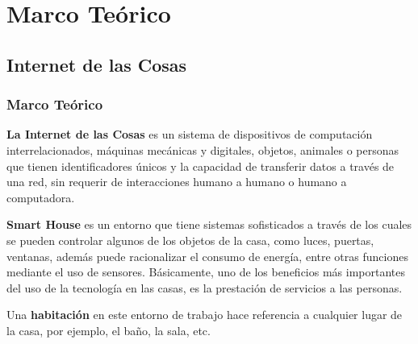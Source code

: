 \section{Marco Teórico}

\begin{frame}
\subsection{Internet de las Cosas}
\frametitle{Marco Teórico}

\small
\textbf{La Internet de las Cosas} es un sistema de dispositivos de computación interrelacionados, máquinas mecánicas y digitales, objetos, animales o personas que tienen identificadores únicos y la capacidad de transferir datos a través de una red, sin requerir de interacciones humano a humano o humano a computadora. \newline

\textbf{Smart House} es un entorno que tiene sistemas sofisticados a través de los cuales se pueden controlar algunos de los objetos de la casa, como luces, puertas, ventanas, además puede racionalizar el consumo de energía, entre otras funciones mediante el uso de sensores. Básicamente, uno de los beneficios más importantes del uso de la tecnología en las casas, es la prestación de servicios a las personas.\cite{Howedi2016}\newline

Una \textbf{habitación} en este entorno de trabajo hace referencia a cualquier lugar de la casa, por ejemplo, el baño, la sala, etc.
\end{frame}